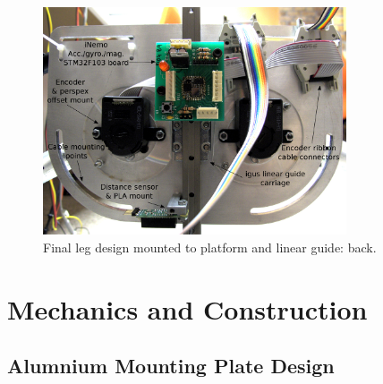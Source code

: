 \begin{figure}
\centering
\includegraphics[width=0.8\textwidth]{images/mechanical/encoder-mount-annotated} 
\caption{Final leg design mounted to platform and linear guide: back.}
\label{fig:Final leg design - back}
\end{figure}

\section{Mechanics and Construction}

\subsection{Alumnium Mounting Plate Design}

